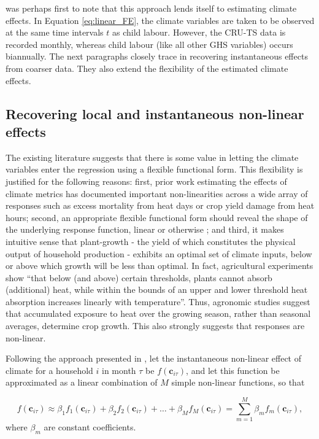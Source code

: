 \documentclass[a4paper,12pt]{article}
\theoremstyle{plain}
\theoremstyle{definition}
\theoremstyle{definition}
\theoremstyle{definition}
\theoremstyle{definition}
\begin{document}
\citet{huntington1922} was perhaps first to note that this approach lends itself to estimating climate effects. In Equation \ref{eq:linear_FE}, the climate variables are taken to be observed at the same time intervals $t$ as child labour. However, the CRU-TS data is recorded monthly, whereas child labour (like all other GHS variables) occurs biannually. The next paragraphs closely trace \citet{Hsiang2016a} in recovering instantaneous effects from coarser data. They also extend the flexibility of the estimated climate effects.

\subsection{Recovering local and instantaneous non-linear effects}

The existing literature suggests that there is some value in letting the climate variables enter the regression using a flexible functional form. This flexibility is justified for the following reasons: first, prior work estimating the effects of climate metrics has documented important non-linearities across a wide array of responses \citep{Carleton2016} such as excess mortality from heat days \citep{deschenes2011} or crop yield damage from heat hours\citep{Schlenker2009}; second, an appropriate flexible functional form should reveal the shape of the underlying response function, linear or otherwise \citep{Hsiang2016a}; and third, it makes intuitive sense that plant-growth - the yield of which constitutes the physical output of household production - exhibits an optimal set of climate inputs, below or above which growth will be less than optimal. In fact, agricultural experiments show ``that below (and above) certain thresholds, plants cannot absorb (additional) heat, while within the bounds of an upper and lower threshold heat absorption increases linearly with temperature''\citep[][p. 239]{Jessoe2018}. Thus, agronomic studies suggest that accumulated exposure to heat over the growing season, rather than seasonal averages, determine crop growth. This also strongly suggests that responses are non-linear.

Following the approach presented in \citet{Hsiang2016a}, let the instantaneous non-linear effect of climate for a household $i$ in month $\tau$ be $f(\mathbf{c}_{i\tau})$, and let this function be approximated as a linear combination of $M$ simple non-linear functions, so that

\begin{equation}
\label{eq:nonlinear_approx}
    f(\mathbf{c}_{i\tau})\approx \beta_1 f_1(\mathbf{c}_{i\tau}) + \beta_2 f_2(\mathbf{c}_{i\tau})+\dots+\beta_M f_M(\mathbf{c}_{i\tau}) = \sum_{m=1}^M \beta_m f_m(\mathbf{c}_{i\tau}),
\end{equation}
where $\beta_m$ are constant coefficients. 
\end{document}
